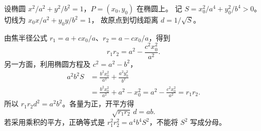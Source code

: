 \begin{proofbox}
设椭圆 $x^2/a^2+y^2/b^2=1$，$P=(x_0,y_0)$ 在椭圆上。
记 $S=x_0^2/a^4+y_0^2/b^4>0$。切线为 $x_0x/a^2+y_0y/b^2=1$，
故原点到切线距离 $d=1/\sqrt S$。
\par\medskip\noindent
由焦半径公式 $r_1=a+cx_0/a$、$r_2=a-cx_0/a$，得到
\[
r_1r_2=a^2-\frac{c^2x_0^2}{a^2}.
\]
另一方面，利用椭圆方程及 $c^2=a^2-b^2$，
\[
\begin{aligned}
a^2b^2S&=\frac{b^2x_0^2}{a^2}+\frac{a^2y_0^2}{b^2}\\
&=\frac{b^2x_0^2}{a^2}+a^2-x_0^2
=a^2-\frac{c^2x_0^2}{a^2}=r_1r_2.
\end{aligned}
\]
所以 $r_1r_2d^2=a^2b^2$。各量为正，开平方得
\[
\boxed{\sqrt{r_1r_2}\,d=ab}.
\]
若采用乘积的平方，正确等式是 $r_1^2r_2^2=a^4b^4S^2$，不能将 $S^2$ 写成分母。
\end{proofbox}
